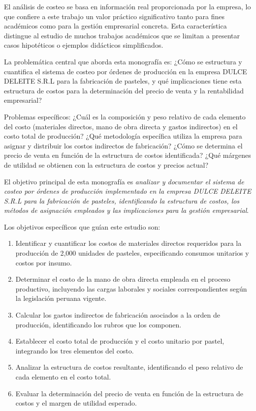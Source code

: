 \documentclass[
  stu,
  floatsintext,
  longtable,
  a4paper,
  nolmodern,
  notxfonts,
  notimes,
  12pt,
  colorlinks=true,linkcolor=blue,citecolor=blue,urlcolor=blue]{apa7}
\begin{document}
El análisis de costeo se basa en información real proporcionada por la
empresa, lo que confiere a este trabajo un valor práctico significativo
tanto para fines académicos como para la gestión empresarial concreta.
Esta característica distingue al estudio de muchos trabajos académicos
que se limitan a presentar casos hipotéticos o ejemplos didácticos
simplificados.

La problemática central que aborda esta monografía es: ¿Cómo se
estructura y cuantifica el sistema de costeo por órdenes de producción
en la empresa DULCE DELEITE S.R.L para la fabricación de pasteles, y qué
implicaciones tiene esta estructura de costos para la determinación del
precio de venta y la rentabilidad empresarial?

Problemas específicos: ¿Cuál es la composición y peso relativo de cada
elemento del costo (materiales directos, mano de obra directa y gastos
indirectos) en el costo total de producción? ¿Qué metodología específica
utiliza la empresa para asignar y distribuir los costos indirectos de
fabricación? ¿Cómo se determina el precio de venta en función de la
estructura de costos identificada? ¿Qué márgenes de utilidad se obtienen
con la estructura de costos y precios actual?

El objetivo principal de esta monografía es \emph{analizar y documentar
el sistema de costeo por órdenes de producción implementado en la
empresa DULCE DELEITE S.R.L para la fabricación de pasteles,
identificando la estructura de costos, los métodos de asignación
empleados y las implicaciones para la gestión empresarial}.

Los objetivos específicos que guían este estudio son:

\begin{enumerate}
\def\labelenumi{\arabic{enumi}.}
\item
  Identificar y cuantificar los costos de materiales directos requeridos
  para la producción de 2,000 unidades de pasteles, especificando
  consumos unitarios y costos por insumo.
\item
  Determinar el costo de la mano de obra directa empleada en el proceso
  productivo, incluyendo las cargas laborales y sociales
  correspondientes según la legislación peruana vigente.
\item
  Calcular los gastos indirectos de fabricación asociados a la orden de
  producción, identificando los rubros que los componen.
\item
  Establecer el costo total de producción y el costo unitario por
  pastel, integrando los tres elementos del costo.
\item
  Analizar la estructura de costos resultante, identificando el peso
  relativo de cada elemento en el costo total.
\item
  Evaluar la determinación del precio de venta en función de la
  estructura de costos y el margen de utilidad esperado.
\end{enumerate}
\end{document}
